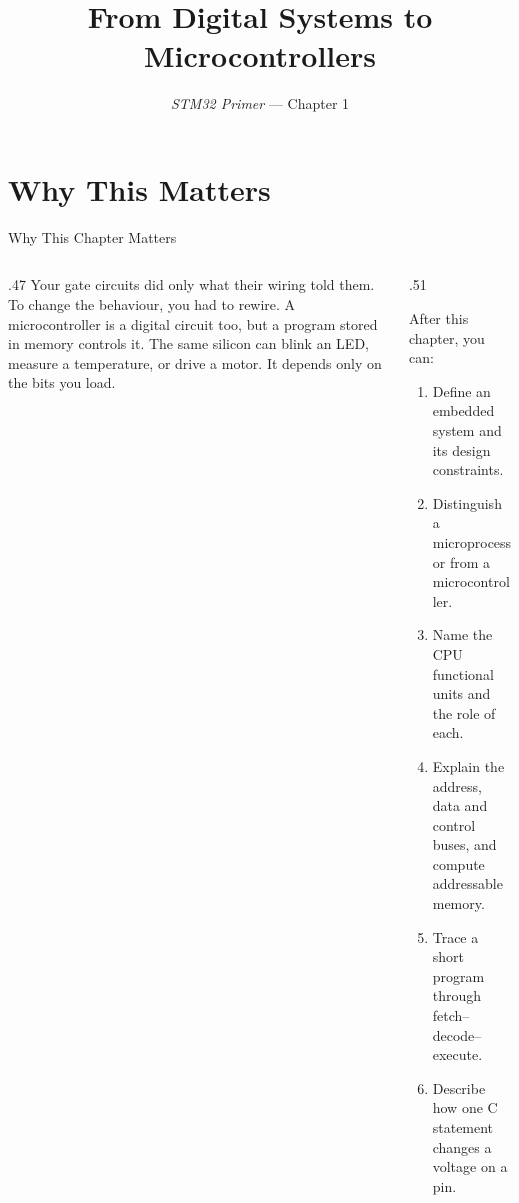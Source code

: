 \documentclass[9pt,aspectratio=169,xcolor=table]{beamer}
\title{From Digital Systems to Microcontrollers}
\subtitle{\emph{STM32 Primer} --- Chapter 1}
\begin{document}
\titlepage

\section{Why This Matters}

\begin{frame}{Why This Chapter Matters}
    \begin{columns}[c]
    \begin{column}{.47\textwidth}
        {\normalsize Your gate circuits did only what their \alert{wiring} told them. To change the behaviour, you had to rewire. A microcontroller is a digital circuit too, but a \alert{program stored in memory} controls it. The same silicon can blink an LED, measure a temperature, or drive a motor. It depends only on the bits you load.}
    \end{column}
    \begin{column}{.51\textwidth}
        \begin{block}{After this chapter, you can:}
        {\small
        \begin{enumerate}\itemsep2pt
            \item Define an embedded system and its design constraints.
            \item Distinguish a \alert{microprocessor} from a \alert{microcontroller}.
            \item Name the CPU functional units and the role of each.
            \item Explain the address, data and control buses, and compute addressable memory.
            \item Trace a short program through fetch--decode--execute.
            \item Describe how one C statement changes a voltage on a pin.
        \end{enumerate}}
        \end{block}
    \end{column}
    \end{columns}
\end{frame}
\end{document}

